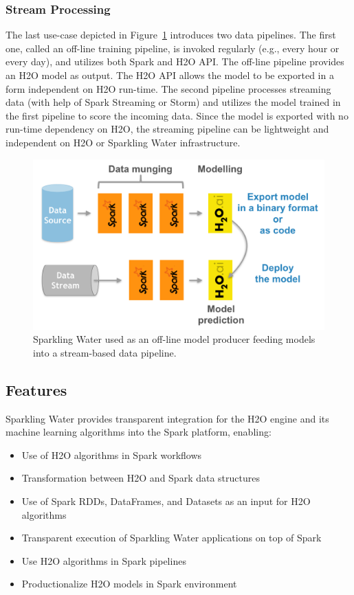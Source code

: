 \documentclass{standalone}
\begin{document}
    \subsubsection{Stream Processing}
    The last use-case depicted in Figure~\ref{fig:use-case-3} introduces two data pipelines. The first one, called
    an off-line training pipeline, is invoked regularly (e.g., every hour or every day), and utilizes both Spark and H2O API.
    The off-line pipeline provides an H2O model as output. The H2O API allows the model to be exported in a form independent
    on H2O run-time. The second pipeline processes streaming data (with help of Spark Streaming or Storm) and utilizes the
    model trained in the first pipeline to score the incoming data. Since the model is exported with no run-time dependency
    on H2O, the streaming pipeline can be lightweight and independent on H2O or Sparkling Water infrastructure.

    \begin{figure}[h!]
        \centering
        \includegraphics[scale=0.3]{../images/use-case-3.png}
        \caption{Sparkling Water used as an off-line model producer feeding models into a stream-based data pipeline.}
        \label{fig:use-case-3}
    \end{figure}

    \subsection{Features}

    Sparkling Water provides transparent integration for the H2O engine and its machine learning algorithms into
    the Spark platform, enabling:

    \begin{itemize}
        \item Use of H2O algorithms in Spark workflows
        \item Transformation between H2O and Spark data structures
        \item Use of Spark RDDs, DataFrames, and Datasets as an input for H2O algorithms
        \item Transparent execution of Sparkling Water applications on top of Spark
        \item Use H2O algorithms in Spark pipelines
        \item Productionalize H2O models in Spark environment
    \end{itemize}
\end{document}
